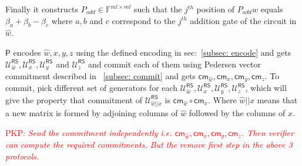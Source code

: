 \documentclass[runningheads]{llncs}
\newcommand{\pnote}[1] {\textcolor{red}  {PKP: \sl{#1}}}
\def\prover{\mathsf{P}}
\def\RS{\mathsf{RS}} %
\def\cm{\mathsf{cm}} %
\def\extwit{\hat{w}} %
\def\oracle{\mathcal{U}^{\RS}}
\def\bbF{\mathbb{F}}
\begin{document}
	Finally it constructs $P_{add} \in \bbF^{ml \times ml}$ such that the $j^{th}$ position of $P_{add} \extwit$ equals $\beta_a + \beta_b - \beta_c$ where $a, b$ and $c$ correspond to the $j^{th}$ addition gate of the circuit in $\extwit$.
	
	$\prover$ encodes $\extwit , x, y , z$ using the defined encoding in sec:~\ref{subsec: encode} and gets $\oracle_{\extwit}, \oracle_x, \oracle_y$ and $\oracle_z$ and commit each of them using Pedersen vector commitment described in ~\ref{subsec: commit} and gets $\cm_{\extwit}, \cm_x, \cm_y, \cm_z$. To commit, pick different set of generators for each $\oracle_{\extwit}, \oracle_x, \oracle_y, \oracle_z$, which will give the property that commitment of $\oracle_{\extwit||x}$ is $\cm_{\extwit} \circ \cm_x$. Where $\extwit||x$ means that a new matrix is formed by adjoining columns of $\extwit$ followed by the columns of $x$. 
	
	
	\pnote{Send the commitment independently i.e. $\cm_{\extwit}, \cm_x, \cm_y, \cm_z$. Then verifier can compute the required commitments. But the remove first step in the above 3 protocols.}
	
\end{document}
